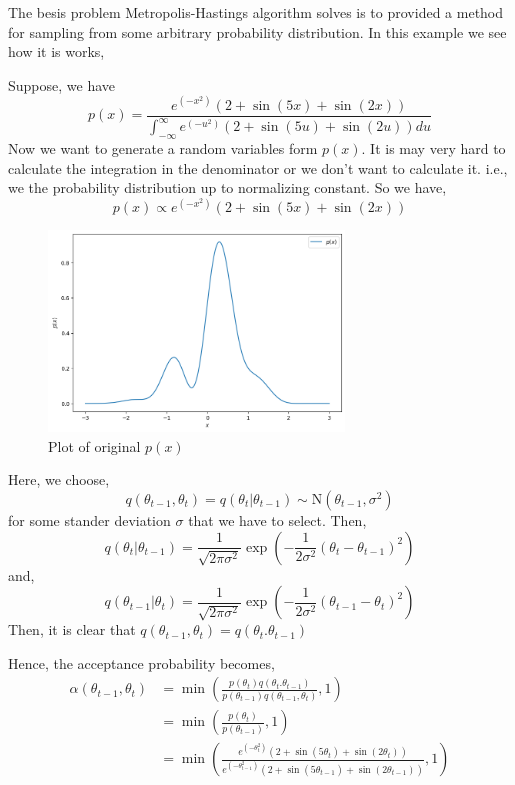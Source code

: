 \begin{example}
    The besis problem Metropolis-Hastings algorithm solves is to provided a method for sampling from some arbitrary probability distribution. In this example we see how it is works,

    Suppose, we have 
    \[
        p(x) = \frac{e^{(-x^2)} \left( 2 + \sin(5x) + \sin(2x) \right) }{ \int_{-\infty}^{\infty} e^{(-u^2)} \left( 2 + \sin(5u) + \sin(2u) \right) du }
    \]
    Now we want to generate a random variables form $ p(x) $. It is may very hard to calculate the integration in the denominator or we don't want to calculate it. i.e., we the probability distribution up to normalizing constant.
    So we have,
    \[
        p(x) \propto e^{(-x^2)} \left( 2 + \sin(5x) + \sin(2x) \right) 
    \]
    \begin{figure}[H]
        \centering
        \includegraphics[width=0.7\textwidth]{./images/metropolis/example1/plot-of-px.png}
        \caption{Plot of original $p(x)$}
        \label{plot of px}
    \end{figure}

    Here, we choose,
    \[
        q(\theta_{t-1}, \theta_{t}) = q(\theta_t|\theta_{t-1}) \sim \text{N}(\theta_{t-1},\sigma^2)
    \]
    for some stander deviation $ \sigma $ that we have to select.
    Then,
    \[
        q(\theta_{t} | \theta_{t-1}) = \frac{1}{\sqrt{2 \pi \sigma^2}} \exp \left( - \frac{1}{2 \sigma^2} (\theta_t - \theta_{t-1})^2 \right) 
    \]
    and,
    \[
        q(\theta_{t-1}|\theta_t) = \frac{1}{\sqrt{2 \pi \sigma^2}} \exp \left( - \frac{1}{2 \sigma^2} (\theta_{t-1} - \theta_{t})^2 \right)
    \]
    Then, it is clear that $ q(\theta_{t-1},\theta_t) = q(\theta_t.\theta_{t-1}) $
    
    Hence, the acceptance probability becomes,
    \begin{align*}
        \alpha(\theta_{t-1},\theta_{t}) &= \min \left(  \frac{p(\theta_t)q(\theta_t.\theta_{t-1})}{p(\theta_{t-1})q(\theta_{t-1},\theta_t)}  , 1 \right) \\ 
                                        &= \min \left( \frac{p(\theta_t)}{p(\theta_{t-1})} , 1 \right) \\
                                        &= \min \left( \frac{e^{(-\theta_t^2)}(2 + \sin(5 \theta_t) + \sin(2 \theta_t)) }{e^{(-\theta_{t-1}^2)}(2 + \sin(5 \theta_{t-1}) + \sin(2 \theta_{t-1})) }  , 1 \right)
    \end{align*}
    

\end{example}
